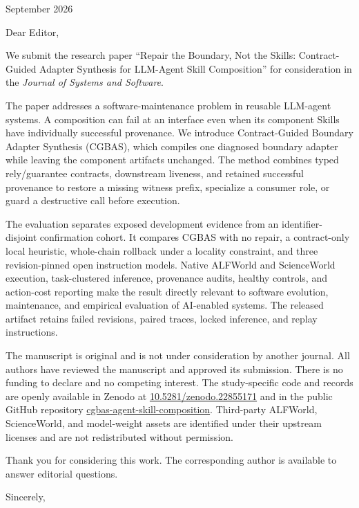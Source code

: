 \documentclass[11pt]{article}
\begin{document}
\begin{flushright}
September 2026
\end{flushright}

Dear Editor,

We submit the research paper ``Repair the Boundary, Not the Skills:
Contract-Guided Adapter Synthesis for LLM-Agent Skill Composition'' for
consideration in the \emph{Journal of Systems and Software}.

The paper addresses a software-maintenance problem in reusable LLM-agent
systems. A composition can fail at an interface even when its component Skills
have individually successful provenance. We introduce Contract-Guided Boundary
Adapter Synthesis (CGBAS), which compiles one diagnosed boundary adapter while
leaving the component artifacts unchanged. The method combines typed
rely/guarantee contracts, downstream liveness, and retained successful
provenance to restore a missing witness prefix, specialize a consumer role, or
guard a destructive call before execution.

The evaluation separates exposed development evidence from an identifier-
disjoint confirmation cohort. It compares CGBAS with no repair, a contract-only
local heuristic, whole-chain rollback under a locality constraint, and three
revision-pinned open instruction models. Native ALFWorld and ScienceWorld
execution, task-clustered inference, provenance audits, healthy controls, and
action-cost reporting make the result directly relevant to software evolution,
maintenance, and empirical evaluation of AI-enabled systems. The released
artifact retains failed revisions, paired traces, locked inference, and replay
instructions.

The manuscript is original and is not under consideration by another journal.
All authors have reviewed the manuscript and approved its submission. There is
no funding to declare and no competing interest. The study-specific code and
records are openly available in Zenodo at
\href{https://doi.org/10.5281/zenodo.22855171}{10.5281/zenodo.22855171} and in
the public GitHub repository
\href{https://github.com/ls680/cgbas-agent-skill-composition}{cgbas-agent-skill-composition}.
Third-party ALFWorld, ScienceWorld, and model-weight assets are identified
under their upstream licenses and are not redistributed without permission.

Thank you for considering this work. The corresponding author is available to
answer editorial questions.

Sincerely,
\end{document}
